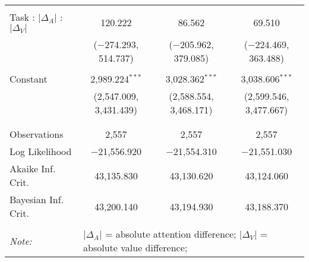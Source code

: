 \begin{table}[h]
\begin{tabular}{@{\extracolsep{5pt}}lccc}
  & & & \\ 
 Task : $\vert\Delta_A\vert$ :  $\vert\Delta_V\vert$ & 120.222 & 86.562 & 69.510 \\ 
  & ($-$274.293, 514.737) & ($-$205.962, 379.085) & ($-$224.469, 363.488) \\ 
  & & & \\ 
 Constant & 2,989.224$^{***}$ & 3,028.362$^{***}$ & 3,038.606$^{***}$ \\ 
  & (2,547.009, 3,431.439) & (2,588.554, 3,468.171) & (2,599.546, 3,477.667) \\ 
  & & & \\ 
\hline \\[-1.8ex] 
Observations & 2,557 & 2,557 & 2,557 \\ 
Log Likelihood & $-$21,556.920 & $-$21,554.310 & $-$21,551.030 \\ 
Akaike Inf. Crit. & 43,135.830 & 43,130.620 & 43,124.060 \\ 
Bayesian Inf. Crit. & 43,200.140 & 43,194.930 & 43,188.370 \\ 
\hline 
\hline \\[-1.8ex] 
\textit{Note:}  & \multicolumn{3}{l}{\footnotesize $\vert\Delta_A\vert$ = absolute attention difference; $\vert\Delta_V\vert$ = absolute value difference; } \\ 
\end{tabular} 
\end{table} 
